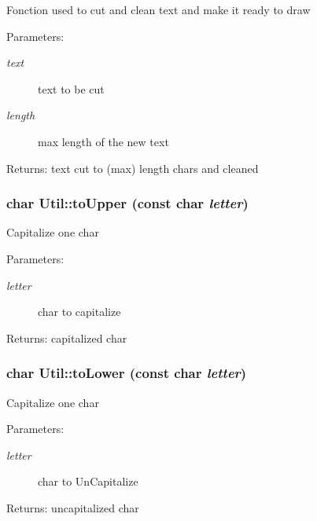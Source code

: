 Fonction used to cut and clean text and make it ready to draw \begin{Desc}
\item[Parameters:]
\begin{description}
\item[{\em text}]text to be cut \item[{\em length}]max length of the new text \end{description}
\end{Desc}
\begin{Desc}
\item[Returns:]text cut to (max) length chars and cleaned \end{Desc}
\subsubsection{\setlength{\rightskip}{0pt plus 5cm}char Util::toUpper (const char {\em letter})\hspace{0.3cm}{\tt  [static]}}\label{classUtil_714ac4b097bb9b71c100a600558df93e}


Capitalize one char \begin{Desc}
\item[Parameters:]
\begin{description}
\item[{\em letter}]char to capitalize \end{description}
\end{Desc}
\begin{Desc}
\item[Returns:]capitalized char \end{Desc}
\subsubsection{\setlength{\rightskip}{0pt plus 5cm}char Util::toLower (const char {\em letter})\hspace{0.3cm}{\tt  [static]}}\label{classUtil_38a875276038938a12f54c446e3ebb52}


Capitalize one char \begin{Desc}
\item[Parameters:]
\begin{description}
\item[{\em letter}]char to UnCapitalize \end{description}
\end{Desc}
\begin{Desc}
\item[Returns:]uncapitalized char \end{Desc}

